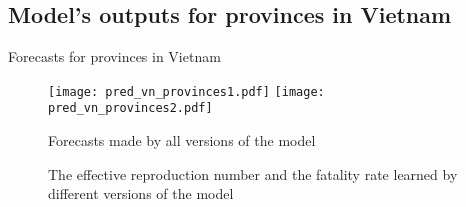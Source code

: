 \subsection{Model's outputs for provinces in Vietnam}

\begin{frame}[allowframebreaks]{Forecasts for provinces in Vietnam}

    \begin{figure}[!htb]
        \centering
        \texttt{[image: pred\_vn\_provinces1.pdf]}
        \texttt{[image: pred\_vn\_provinces2.pdf]}
        \caption{Forecasts made by all versions of the model}
    \end{figure}

    \framebreak

    \begin{figure}[!htb]
        \centering
        \caption{The effective reproduction number and the fatality rate learned by different versions of the model}
    \end{figure}

\end{frame}

